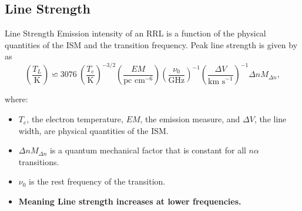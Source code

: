 \documentclass[aspectratio=169]{beamer}
\begin{document}
\subsection{Line Strength}
\begin{frame}{Line Strength}{}
  Emission intensity of an RRL is a function of the physical quantities of the ISM and the transition frequency. Peak line strength is given by \cite{andersonGBTDiffuseIonized2021} as
  \begin{equation*}
    \left( \frac{T_L}{\text{K}} \right) \backsimeq 3076~\left(\frac{T_e}{\text{K}}\right)^{-3/2}\left(\frac{EM}{\text{pc cm}^{-6}}\right) \left(\frac{\nu_0}{\text{GHz}}\right)^{-1} \left(\frac{\Delta V}{\text{km s}^{-1}} \right)^{-1} \Delta n M_{\Delta n},
    \label{eq:line_intensity}
  \end{equation*}

where:
\begin{itemize} 
  \item $T_e$, the electron temperature, $EM$, the emission measure, and $\Delta V$, the line width, are physical quantities of the ISM. 
  \item $\Delta n M_{\Delta n}$ is a quantum mechanical factor that is constant for all $n\alpha$ transitions. 
  \item $\nu_0$ is the rest frequency of the transition. \\
  \item \textbf{Meaning Line strength increases at lower frequencies.}
\end{itemize}
\end{frame}
\end{document}
